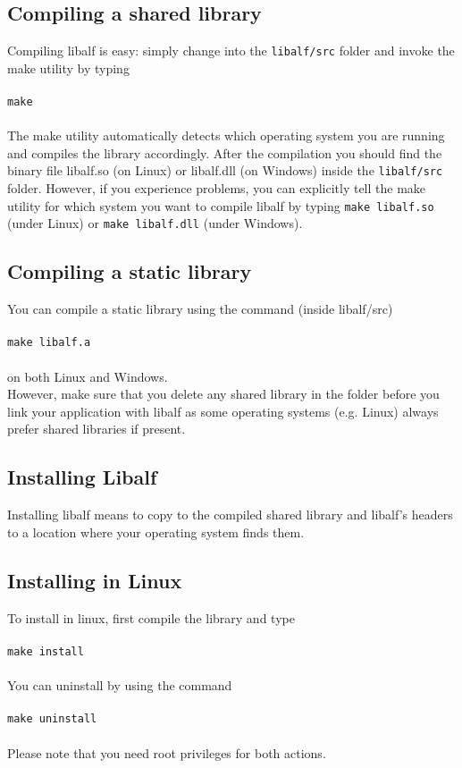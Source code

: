 \subsection*{Compiling a shared library}
Compiling libalf is easy: simply change into the \texttt{libalf/src} folder and invoke the make utility by typing 
\\ \\
\texttt{make}
\\ \\
The make utility automatically detects which operating system you are running and compiles the library accordingly. After the compilation you should find the binary file libalf.so (on Linux) or libalf.dll (on Windows) inside the \texttt{libalf/src} folder.
However, if you experience problems, you can explicitly tell the make utility for which system you want to compile libalf by typing \texttt{make libalf.so} (under Linux) or \texttt{make libalf.dll} (under Windows).

\subsection*{Compiling a static library}
You can compile a static library using the command (inside libalf/src)
\\ \\
\texttt{make libalf.a}
\\ \\
on both Linux and Windows. \\ However, make sure that you delete any shared library in the folder before you link your application with libalf as some operating systems (e.g. Linux) always prefer shared libraries if present.

\subsection{Installing Libalf}
Installing libalf means to copy to the compiled shared library and libalf’s headers to a location where your operating system finds them.
\subsection*{Installing in Linux}
To install \libalf in linux, first compile the library and type
\\ \\
\texttt{make install}
\\ \\
You can uninstall \libalf by using the command
\\ \\
\texttt{make uninstall}
\\ \\
Please note that you need root privileges for both actions.

